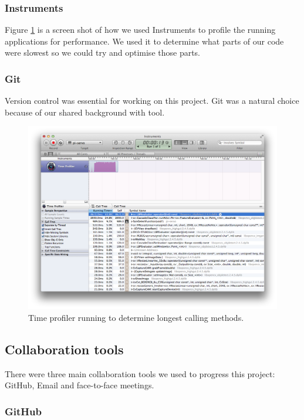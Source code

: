 \documentclass[11pt,a4paper,titlepage]{report}
\begin{document}
\subsubsection{Instruments}

      Figure \ref{fig:instruments} is a screen shot of how we used Instruments to profile the running applications for performance. We used it to determine what parts of our code were slowest so we could try and optimise those parts.
  
\subsubsection{Git}
      Version control was essential for working on this project. Git was a natural choice because of our shared background with tool.


\begin{figure}
\centering
\includegraphics[width=\textwidth]{graphs/instruments.png}
\caption{Time profiler running to determine longest calling methods.}
\label{fig:instruments}
\end{figure}

\subsection{Collaboration tools}

There were three main collaboration tools we used to progress this project: GitHub, Email and face-to-face meetings.

\subsubsection{GitHub}
\end{document}
